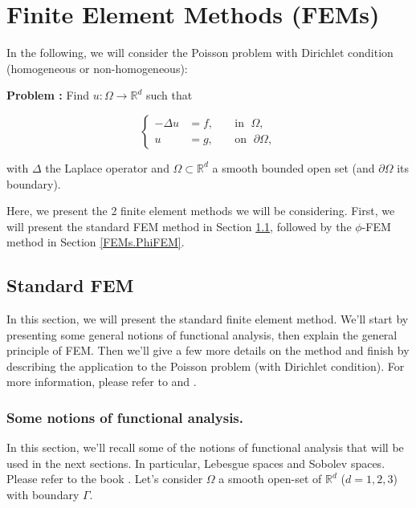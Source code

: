 \section{Finite Element Methods (FEMs)} \label{FEMs}
\graphicspath{{images/FEM}}

In the following, we will consider the Poisson problem with Dirichlet condition (homogeneous or non-homogeneous):

\textbf{Problem :} Find $u : \Omega \rightarrow \mathbb{R}^d$ such that

\begin{equation*}
	\left\{
		\begin{aligned}
			-\Delta u &= f, \; &&\text{in } \; \Omega, \\
			u&=g, \; &&\text{on } \; \partial\Omega,
		\end{aligned}
	\right.
\end{equation*}

with $\Delta$ the Laplace operator and $\Omega\subset\mathbb{R}^d$ a smooth bounded open set (and $\partial\Omega$ its boundary).

Here, we present the 2 finite element methods we will be considering. First, we will present the standard FEM method in Section \ref{FEMs.FEM}, followed by the $\phi$-FEM method in Section \ref{FEMs.PhiFEM}.

\subsection{Standard FEM} \label{FEMs.FEM}

In this section, we will present the standard finite element method. We'll start by presenting some general notions of functional analysis, then explain the general principle of FEM. Then we'll give a few more details on the method and finish by describing the application to the Poisson problem (with Dirichlet condition). For more information, please refer to \cite{quarteroni_methodes_2007} and \cite{noauthor_methodes_nodate}.

\subsubsection{Some notions of functional analysis.}

In this section, we'll recall some of the notions of functional analysis that will be used in the next sections. In particular, Lebesgue spaces and Sobolev spaces. Please refer to the book \cite{brezis_functional_2011}. Let's consider $\Omega$ a smooth open-set of $\mathbb{R}^d$ ($d=1,2,3$) with boundary $\Gamma$.

